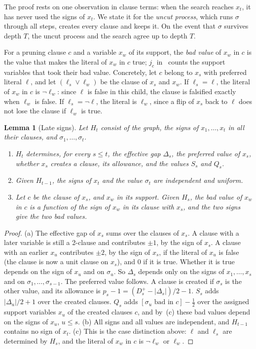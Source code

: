 \documentclass[11pt,a4paper]{article}
\newtheorem{lemma}[theorem]{Lemma}
\theoremstyle{remark}
\begin{document}
The proof rests on one observation in clause terms: when the search reaches
$x_t$, it has never used the signs of $x_t$. We state it for the \emph{uncut
process}, which runs $\sigma$ through all steps, creates every clause and keeps
it. On the event that $\sigma$ survives depth $T$, the uncut process and the
search agree up to depth $T$.

For a pruning clause $c$ and a variable $x_w$ of its support, the \emph{bad
value} of $x_w$ in $c$ is the value that makes the literal of $x_w$ in $c$
true; $j_c$ in~\cite[Lemma~2]{N7} counts the support variables that took their
bad value. Concretely, let $c$ belong to $x_s$ with preferred literal $\ell$,
and let $(\ell_s\vee\ell_w)$ be the clause of $x_s$ and $x_w$. If
$\ell_s=\ell$, the literal of $x_w$ in $c$ is $\neg\ell_w$: since $\ell$ is
false in this child, the clause is falsified exactly when $\ell_w$ is false.
If $\ell_s=\neg\ell$, the literal is $\ell_w$, since a flip of $x_s$ back to
$\ell$ does not lose the clause if $\ell_w$ is true.

\begin{lemma}[Late signs]\label{lem:late}
Let $H_t$ consist of the graph, the signs of $x_1,\dots,x_t$ in all their
clauses, and $\sigma_1,\dots,\sigma_t$.
\begin{enumerate}
 \item[(a)] $H_t$ determines, for every $s\le t$, the effective gap $\Delta_s$,
 the preferred value of $x_s$, whether $x_s$ creates a clause, its allowance,
 and the values $S_s$ and $Q_s$.
 \item[(b)] Given $H_{t-1}$, the signs of $x_t$ and the value $\sigma_t$ are
 independent and uniform.
 \item[(c)] Let $c$ be the clause of $x_s$, and $x_w$ in its support. Given
 $H_s$, the bad value of $x_w$ in $c$ is a function of the sign of $x_w$ in
 its clause with $x_s$, and the two signs give the two bad values.
\end{enumerate}
\end{lemma}

\begin{proof}
(a) The effective gap of $x_s$ sums over the clauses of $x_s$. A clause with a
later variable is still a 2-clause and contributes $\pm1$, by the sign of
$x_s$. A clause with an earlier $x_u$ contributes $\pm2$, by the sign of
$x_s$, if the literal of $x_u$ is false (the clause is now a unit clause on
$x_s$), and $0$ if it is true. Whether it is true depends on the sign of $x_u$
and on $\sigma_u$. So $\Delta_s$ depends only on the signs of
$x_1,\dots,x_s$ and on $\sigma_1,\dots,\sigma_{s-1}$. The preferred value
follows. A clause is created if $\sigma_s$ is the other value, and its
allowance is $p_s-1=(D^+_s-|\Delta_s|)/2-1$. $S_s$ adds $|\Delta_u|/2+1$ over
the created clauses. $Q_s$ adds $[\sigma_u\text{ bad in }c]-\frac12$ over the
assigned support variables $x_u$ of the created clauses $c$, and by~(c) these
bad values depend on the signs of $x_u$, $u\le s$. (b) All signs and all
values are independent, and $H_{t-1}$ contains no sign of $x_t$. (c) This is
the case distinction above: $\ell$ and $\ell_s$ are determined by $H_s$, and
the literal of $x_w$ in $c$ is $\neg\ell_w$ or $\ell_w$.
\end{proof}
\end{document}
